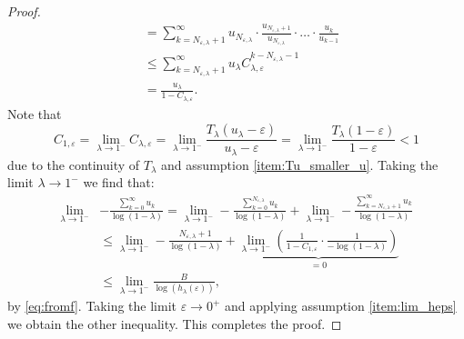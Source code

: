 \documentclass[12pt]{report}
\begin{document}
\begin{proof}
\begin{align*}
		&= \sum_{k=N_{\varepsilon, \lambda}+1}^\infty u_{N_{\varepsilon, \lambda}} \cdot \frac{u_{N_{\varepsilon, \lambda}+1}}{u_{N_{\varepsilon,\lambda}}} \cdot \dots \cdot \frac{u_k}{u_{k-1}}\\
		& \leq \sum_{k=N_{\varepsilon, \lambda}+1}^\infty u_\lambda C_{\lambda,\varepsilon}^{k-N_{\varepsilon, \lambda}-1} \\
		&= \frac{u_\lambda}{1-C_{\lambda,\varepsilon}}.
	\end{align*}
	Note that $$
	C_{1,\varepsilon}=\lim_{\lambda \rightarrow 1^-} C_{\lambda,\varepsilon}
	= \lim_{\lambda \rightarrow 1^-} \frac{T_\lambda(u_\lambda - \varepsilon)}{u_\lambda - \varepsilon}
	= \lim_{\lambda \rightarrow 1^-} \frac{T_\lambda(1 - \varepsilon)}{1 - \varepsilon}
	<1$$ due to the continuity of $T_\lambda$ and assumption \ref{item:Tu_smaller_u}. 
	Taking the limit $\lambda \rightarrow 1^-$ we find that:
	\begin{align*}
		\lim_{\lambda \rightarrow 1^-} &- \frac{\sum_{k=0}^\infty u_k}{\log(1-\lambda)} = 
		\lim_{\lambda \rightarrow 1^-} - \frac{\sum_{k=0}^{N_{\varepsilon,\lambda}} u_k}{\log(1-\lambda)} 
		+\lim_{\lambda \rightarrow 1^-} - \frac{\sum_{k=N_{\varepsilon,\lambda}+1}^\infty u_k}{\log(1-\lambda)} \\
		&\leq \lim_{\lambda \rightarrow 1^-} - \frac{N_{\varepsilon,\lambda}+1}{\log(1-\lambda)} + 
		\underbrace{\lim_{\lambda \rightarrow 1^-} \left( \frac{1}{1-C_{1,\varepsilon}} \cdot \frac{1}{-\log(1-\lambda)} \right)}_{=0}\\
		&\leq \lim_{\lambda \rightarrow 1^-} \frac{B}{\log(h_\lambda(\varepsilon))},
	\end{align*}
	by \eqref{eq:fromf}.
	Taking the limit $\varepsilon \rightarrow 0^+$ and applying assumption \ref{item:lim_heps} we obtain the other inequality. This completes the proof.
\end{proof}
\end{document}
